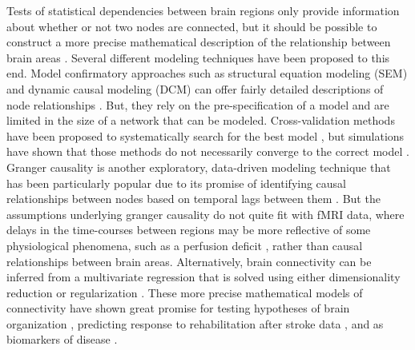 \documentclass{bmcart}
\begin{document}
Tests of statistical dependencies between brain regions only provide information about whether or not two nodes are connected, but it should be possible to construct a more precise mathematical description of the relationship between brain areas \cite{Friston1994}. Several different modeling techniques have been proposed to this end. Model confirmatory approaches such as structural equation modeling (SEM) \cite{Buchel1997} and dynamic causal modeling (DCM) \cite{Friston2003} can offer fairly detailed descriptions of node relationships . But, they rely on the pre-specification of a model and are limited in the size of a network that can be modeled. Cross-validation methods have been proposed to systematically search for the best model \cite{Zhuang2005,Penny2010,James2009}, but simulations have shown that those methods do not necessarily converge to the correct model \cite{Lohmann2012}. Granger causality is another exploratory, data-driven modeling technique that has been particularly popular due to its promise of identifying causal relationships between nodes based on temporal lags between them \cite{Deshpande2011}. But the assumptions underlying granger causality do not quite fit with fMRI data\cite{Smith2011}, where delays in the time-courses between regions may be more reflective of some physiological phenomena, such as a perfusion deficit \cite{Lv2013}, rather than causal relationships between brain areas. Alternatively, brain connectivity can be inferred from a multivariate regression  that is solved using either dimensionality reduction \cite{Friston1994} or regularization \cite{Craddock2013b}. These more precise mathematical models of connectivity have shown great promise for testing hypotheses of brain organization \cite{Craddock2013b}, predicting response to rehabilitation after stroke data \cite{James2009b}, and as biomarkers of disease \cite{Brodersen2011}.
\end{document}
